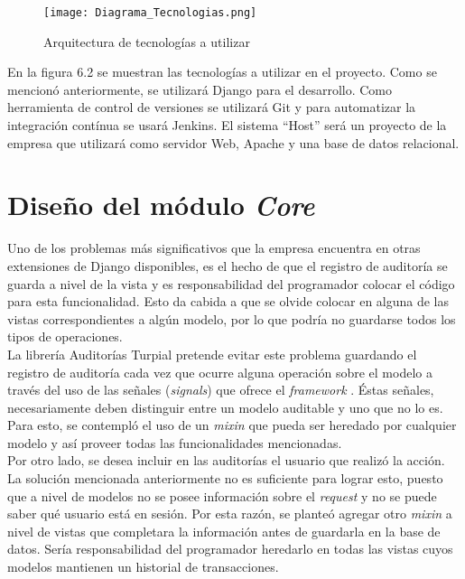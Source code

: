 \begin{figure}
\centering
\texttt{[image: Diagrama\_Tecnologias.png]}
\caption{Arquitectura de tecnologías a utilizar}
\label{fig:figure6.2}
\end{figure}

En la figura 6.2 se muestran las tecnologías a utilizar en el proyecto. Como se mencionó anteriormente, se utilizará Django para el desarrollo. Como herramienta de control de versiones se utilizará Git y para automatizar la integración contínua se usará Jenkins. El sistema “Host” será un proyecto de la empresa que utilizará como servidor Web, Apache y una base de datos relacional.

\section{Diseño del módulo \textit{Core}}

Uno de los problemas más significativos que la empresa encuentra en otras extensiones de Django disponibles, es el hecho de que el registro de auditoría se guarda a nivel de la vista y es responsabilidad del programador colocar el código para esta funcionalidad. Esto da cabida a que se olvide colocar en alguna de las vistas correspondientes a algún modelo, por lo que podría no guardarse todos los tipos de operaciones. \\

La librería Auditorías Turpial pretende evitar este problema guardando el registro de auditoría cada vez que ocurre alguna operación sobre el modelo a través del uso de las señales (\textit{signals}) que ofrece el \textit{framework} . Éstas señales, necesariamente deben distinguir entre un modelo auditable y uno que no lo es. Para esto, se contempló el uso de un \textit{mixin} que pueda ser heredado por cualquier modelo y así proveer todas las funcionalidades mencionadas. \\

Por otro lado, se desea incluir en las auditorías el usuario que realizó la acción. La solución mencionada anteriormente no es suficiente para lograr esto, puesto que a nivel de modelos no se posee información sobre el \textit{request} y no se puede saber qué usuario está en sesión. Por esta razón, se planteó agregar otro \textit{mixin} a nivel de vistas que completara la información antes de guardarla en la base de datos. Sería responsabilidad del programador heredarlo en todas las vistas cuyos modelos mantienen un historial de transacciones. \\


